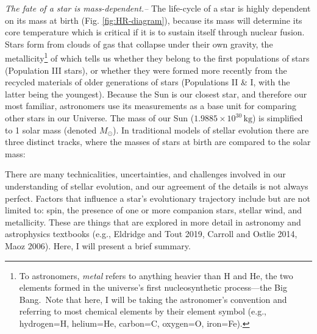 \documentclass[1.5,11pt]{beavtex}
\begin{document}
\textit{The fate of a star is mass-dependent.–} The life-cycle of a star is highly dependent on its mass at birth (Fig. \ref{fig:HR-diagram}), because its mass will determine its core temperature which is critical if it is to sustain itself through nuclear fusion. Stars form from clouds of gas that collapse under their own gravity, the metallicity\footnote{\selectfont To astronomers, \textit{metal} refers to anything heavier than H and He, the two elements formed in the universe's first nucleosynthetic process---the Big Bang. Note that here, I will be taking the astronomer's convention and referring to most chemical elements by their element symbol (e.g., hydrogen=H, helium=He, carbon=C, oxygen=O, iron=Fe).} of which tells us whether they belong to the first populations of stars (Population III stars), or whether they were formed more recently from the recycled materials of older generations of stars (Populations II \& I, with the latter being the youngest). Because the Sun is our closest star, and therefore our most familiar, astronomers use its measurements as a base unit for comparing other stars in our Universe. The mass of our Sun ($1.9885 \times 10^{30} \, \mathrm{kg}$) is simplified to 1 solar mass (denoted \(M_\odot\)). In traditional models of stellar evolution there are three distinct tracks, where the masses of stars at birth are compared to the solar mass:

\begin{center}
\begin{varwidth}{\textwidth}
\begin{itemize}
    \item Brown dwarfs ($<$ 0.08 \(M_\odot\)) 
    \item Low-mass stars (0.08 \(M_\odot\) $< \ M_{\mathrm{star}$ $<$ 8 \(M_\odot\))
    \item High-mass stars ($>$ 8 \(M_\odot\))
\end{itemize}
\end{varwidth}
\end{center}
 
 There are many technicalities, uncertainties, and challenges involved in our understanding of stellar evolution, and our agreement of the details is not always perfect. Factors that influence a star's evolutionary trajectory include but are not limited to: spin, the presence of one or more companion stars, stellar wind, and metallicity. These are things that are explored in more detail in astronomy and astrophysics textbooks (e.g., Eldridge and Tout 2019, Carroll and Ostlie 2014, Maoz 2006).  Here, I will present a brief summary.
 
\end{document}

